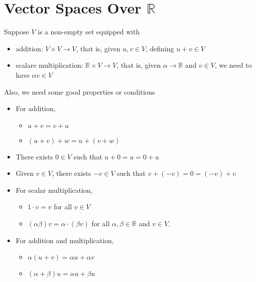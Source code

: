 \section{Vector Spaces Over \(\mathbb{R} \) }
\begin{definition}
    Suppose \(V\) is a non-empty set equipped with 
    \begin{itemize}
        \item addition: \(V \times V \to V\), that is, given \(u,v \in V\), defining \(u + v \in V\)
        \item scalare multiplication: \(\mathbb{R}  \times V \to V\), that is, given \(\alpha \to \mathbb{R} \) and \(v \in V\), we need to have \(\alpha v \in V\)       
    \end{itemize} 
    Also, we need some good properties or conditions 
    \begin{itemize}
        \item For addition, 
        \begin{itemize}
            \item \(u + v = v + u\) 
            \item \((u + v) + w = u + (v + w)\)
        \end{itemize}
        \item There exists \(0 \in V\) such that \(u + 0 = u = 0 + u\)
        \item Given \(v \in V\), there exists \(-v \in V\) such that \(v + (-v) = 0 = (-v) + v\)
        \item For scalar multiplication,
        \begin{itemize}
            \item \(1 \cdot v = v\) for all \(v \in V\) 
            \item \((\alpha \beta ) v = \alpha \cdot (\beta v)\) for all \(\alpha , \beta \in \mathbb{R} \) and \(v \in V\).   
        \end{itemize}
        \item For addition and multiplication, 
        \begin{itemize}
            \item \(\alpha (u + v) = \alpha u + \alpha v\)
            \item \((\alpha + \beta )u = \alpha u + \beta u\)  
        \end{itemize}
    \end{itemize}

\end{definition}